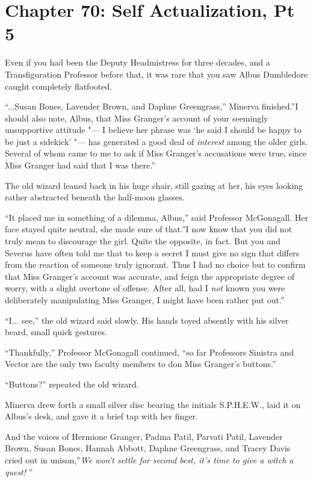 \chapter{Chapter 70: Self Actualization, Pt 5}
Even if you had been the Deputy Headmistress for three decades, and a
Transfiguration Professor before that, it was rare that you saw Albus
Dumbledore caught completely flatfooted.

``...Susan Bones, Lavender Brown, and Daphne Greengrass,'' Minerva
finished.''I should also note, Albus, that Miss Granger's account of
your seemingly unsupportive attitude "--- I believe her phrase was `he said
I should be happy to be just a sidekick' "--- has generated a good deal of
\emph{interest} among the older girls. Several of whom came to me to ask
if Miss Granger's accusations were true, since Miss Granger had said
that I was there.''

The old wizard leaned back in his huge chair, still gazing at her, his
eyes looking rather abstracted beneath the half-moon glasses.

``It placed me in something of a dilemma, Albus,'' said Professor
McGonagall. Her face stayed quite neutral, she made sure of that.''I now
know that you did not truly mean to discourage the girl. Quite the
opposite, in fact. But you and Severus have often told me that to keep a
secret I must give no sign that differs from the reaction of someone
truly ignorant. Thus I had no choice but to confirm that Miss Granger's
account was accurate, and feign the appropriate degree of worry, with a
slight overtone of offense. After all, had I \emph{not} known you were
deliberately manipulating Miss Granger, I might have been rather put
out.''

``I... see,'' the old wizard said slowly. His hands toyed absently
with his silver beard, small quick gestures.

``Thankfully,'' Professor McGonagall continued, ``so far Professors
Sinistra and Vector are the only two faculty members to don Miss
Granger's buttons.''

``Buttons?'' repeated the old wizard.

Minerva drew forth a small silver disc bearing the initials S.P.H.E.W.,
laid it on Albus's desk, and gave it a brief tap with her finger.

And the voices of Hermione Granger, Padma Patil, Parvati Patil, Lavender
Brown, Susan Bones, Hannah Abbott, Daphne Greengrass, and Tracey Davis
cried out in unison,''\emph{We won't settle for second best, it's time
to give a witch a quest!} ''

